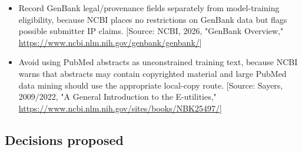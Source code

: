 \documentclass[11pt]{report}
\begin{document}
\begin{itemize}
\item Record GenBank legal/provenance fields separately from model-training eligibility, because NCBI places no restrictions on GenBank data but flags possible submitter IP claims. [Source: NCBI, 2026, "GenBank Overview," \url{https://www.ncbi.nlm.nih.gov/genbank/genbank/}]
\item Avoid using PubMed abstracts as unconstrained training text, because NCBI warns that abstracts may contain copyrighted material and large PubMed data mining should use the appropriate local-copy route. [Source: Sayers, 2009/2022, "A General Introduction to the E-utilities," \url{https://www.ncbi.nlm.nih.gov/sites/books/NBK25497/}]
\end{itemize}

\subsection{Decisions proposed}
\end{document}
